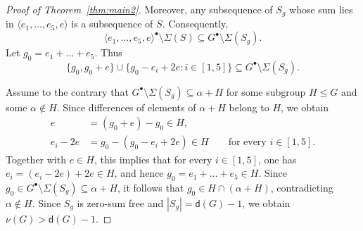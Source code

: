 \documentclass[10pt,a4paper]{amsart}
\newcommand{\dd}{\mathsf d}
\begin{document}
\begin{proof}[Proof of Theorem~\ref{thm:main2}]
Moreover, any subsequence of $S_g$ whose sum lies in
$\langle e_1,\ldots,e_5,e\rangle$ is a subsequence of $S$.
Consequently,
\[
\langle e_1,\ldots,e_5,e\rangle^\bullet\setminus\Sigma(S)
\subseteq G^\bullet\setminus\Sigma(S_g).
\]
Let $g_0=e_1+\ldots+e_5$. Thus
$$\{g_0,g_0+e\}
 \cup\{g_0-e_i+2e:i\in[1,5]\}
 \subseteq G^\bullet\setminus\Sigma(S_g).$$

Assume to the contrary that
$G^\bullet\setminus\Sigma(S_g)\subseteq\alpha+H$
for some subgroup $H\le G$ and some $\alpha\notin H$.
Since differences of elements of $\alpha+H$ belong to $H$,
we obtain
\begin{align*}
	e &= (g_0+e)-g_0\in H,\\
	e_i-2e &= g_0-(g_0-e_i+2e)\in H
	\qquad\text{for every }i\in[1,5].
\end{align*}
Together with $e\in H$, this implies that for every $i\in[1,5]$,
one has $e_i=(e_i-2e)+2e\in H$, and hence
$g_0=e_1+\ldots+e_5\in H$.
Since $g_0\in G^\bullet\setminus\Sigma(S_g)\subseteq\alpha+H$,
it follows that $g_0\in H\cap(\alpha+H)$,
contradicting $\alpha\notin H$.
Since $S_g$ is zero-sum free and $|S_g|=\dd(G)-1$, we obtain $\nu(G)>\dd(G)-1$.
\end{proof}
\end{document}
